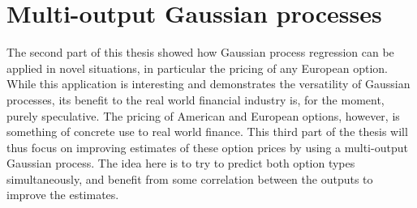 \documentclass[a4paper,12pt]{article}
\begin{document}
\section{Multi-output Gaussian processes}
The second part of this thesis showed how Gaussian process regression can be applied in novel situations, in particular the pricing of any European option. While this application is interesting and demonstrates the versatility of Gaussian processes, its benefit to the real world financial industry is, for the moment, purely speculative. The pricing of American and European options, however, is something of concrete use to real world finance. This third part of the thesis will thus focus on improving estimates of these option prices by using a multi-output Gaussian process. The idea here is to try to predict both option types simultaneously, and benefit from some correlation between the outputs to improve the estimates.
\end{document}

